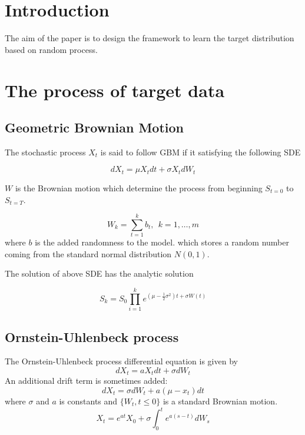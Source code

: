 \documentclass{article}
\begin{document}
		\section{Introduction}
		The aim of the paper is to design the framework to learn the target distribution based on random process.
		
		\section{The process of target data}
		\subsection{Geometric Brownian Motion}
		
				The stochastic process $X_t$ is said to follow GBM if it satisfying the following SDE
				
				\begin{equation}
					dX_t = \mu X_tdt + \sigma X_t dW_t 
				\end{equation}
				
				$W$ is the Brownian motion which determine the process from beginning $S_{t=0}$ to $S_{t=T}$.
				
				\begin{equation}
					W_{k} = \sum_{t=1}^{k} b_{t}, \ \ k = 1, \dots, m
				\end{equation}
				 where $b$ is the added randomness to the model.
				 which stores a random number coming from the standard normal distribution $N(0, 1)$.
			
			The solution of above SDE has the analytic solution
			
			\begin{equation}
				S_{k} = S_{0} \prod_{i=1}^{k}e^{\left(\mu-\frac{1}{2}\sigma^{2}\right)t+\sigma W(t)}
				\label{eq:bm_process}
			\end{equation}
			
			
				
				
	
	\subsection{Ornstein-Uhlenbeck process}
	The Ornstein-Uhlenbeck process differential equation is given by
	\begin{equation}
		dX_t = aX_tdt + \sigma dW_t 
		\label{eq:ornuh_diff}
	\end{equation}
	An additional drift term is sometimes added:
	\begin{equation}
	dX_t = \sigma dW_t +a (\mu-x_t)dt
	\label{eq:ornuh_diff_mean}
	\end{equation}
	where $\sigma$ and $a$ is constants and $\{W_t, t \leq 0\}$ is a standard Brownian motion.
	\begin{equation}
		X_t = e^{at}X_0 + \sigma \int_{0}^{t}e^{a(s-t)}dW_s
			\end{equation}
	
\end{document}

